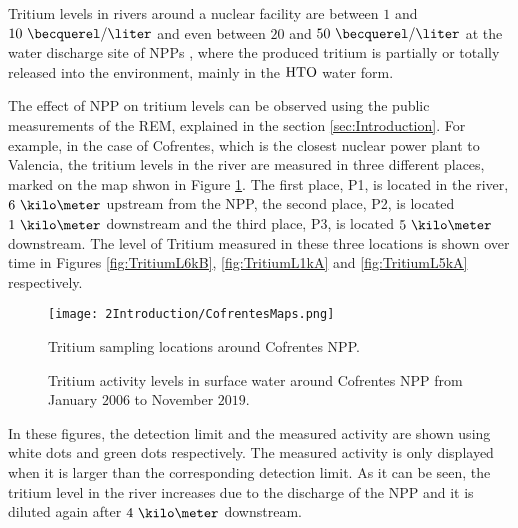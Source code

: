 Tritium levels in rivers around a nuclear facility are between $1$ and $10~\becquerel/\liter$ and even between $20$ and $50~\becquerel/\liter$ at the water discharge site of NPPs \cite{FranceTritiumEnvironment}, where the produced tritium is partially or totally released into the environment, mainly in the $\ce{HTO}$ water form.

The effect of NPP on tritium levels can be observed using the public measurements of the REM, explained in the section \ref{sec:Introduction}. For example, in the case of Cofrentes, which is the closest nuclear power plant to Valencia, the tritium levels in the river are measured in three different places, marked on the map shwon in Figure \ref{fig:SamplingLocations}. The first place, P1, is located in the river, $6~\kilo\meter$ upstream from the NPP, the second place, P2, is located $1~\kilo\meter$ downstream and the third place, P3, is located $5~\kilo\meter$ downstream. The level of Tritium measured in these three locations is shown over time in Figures \ref{fig:TritiumL6kB}, \ref{fig:TritiumL1kA} and \ref{fig:TritiumL5kA} respectively.

\begin{figure}[hbtp]
\texttt{[image: 2Introduction/CofrentesMaps.png]}
\centering
\caption{Tritium sampling locations around Cofrentes NPP.\label{fig:SamplingLocations}}
\end{figure}

\begin{figure}[hbtp]
 \centering
    \newline
 \caption{Tritium activity levels in surface water around Cofrentes NPP from January $2006$ to November $2019$.~\cite{REM}}
 \label{fig:MeasurementsCofrentesSurface}
\end{figure}

In these figures, the detection limit and the measured activity are shown using white dots and green dots respectively. The measured activity is only displayed when it is larger than the corresponding detection limit. As it can be seen, the tritium level in the river increases due to the discharge of the NPP and it is diluted again after $4~\kilo\meter$ downstream. 

